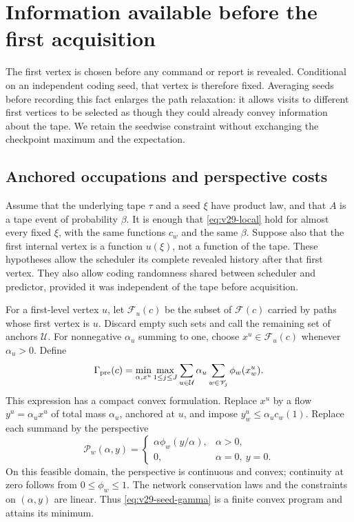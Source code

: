 \section{Information available before the first acquisition}
\label{sec:v29-initial}
The first vertex is chosen before any command or report is revealed.
Conditional on an independent coding seed, that vertex is therefore
fixed. Averaging seeds before recording this fact enlarges the path
relaxation: it allows visits to different first vertices to be selected
as though they could already convey information about the tape. We
retain the seedwise constraint without exchanging the checkpoint maximum
and the expectation.

\subsection{Anchored occupations and perspective costs}
Assume that the underlying tape $\tau$ and a seed $\xi$ have product
law, and that $A$ is a tape event of probability $\beta$. It is enough
that \eqref{eq:v29-local} hold for almost every fixed $\xi$, with the
same functions $c_w$ and the same $\beta$. Suppose also that the first
internal vertex is a function $u(\xi)$, not a function of the tape.
These hypotheses allow the scheduler its complete revealed history
after that first vertex. They also allow coding randomness shared
between scheduler and predictor, provided it was independent of the
tape before acquisition.

For a first-level vertex $u$, let $\mathcal F_u(c)$ be the subset of
$\mathcal F(c)$ carried by paths whose first vertex is $u$.
Discard empty such sets and call the remaining set of anchors $\mathcal U$.
For nonnegative $\alpha_u$ summing to one, choose
$x^u\in\mathcal F_u(c)$ whenever $\alpha_u>0$. Define
\begin{equation}\label{eq:v29-seed-gamma}
 \Gamma_{\rm pre}(c)=
 \min_{\alpha,x^u}\max_{1\le j\le J}
       \sum_{u\in\mathcal U}\alpha_u
                      \sum_{w\in\mathscr V_j}\phi_w(x^u_w).
\end{equation}
This expression has a compact convex formulation. Replace $x^u$ by a
flow $y^u=\alpha_u x^u$ of total mass $\alpha_u$, anchored at $u$, and
impose $y^u_w\le\alpha_u c_w(1)$. Replace each summand by the
perspective
\begin{equation}\label{eq:v29-perspective}
 \mathcal P_w(\alpha,y)=
 \begin{cases}
    \alpha\phi_w(y/\alpha),&\alpha>0,\\
    0,&\alpha=0,\ y=0.
 \end{cases}
\end{equation}
On this feasible domain, the perspective is continuous and convex;
continuity at zero follows from $0\le\phi_w\le1$.
The network conservation laws and the constraints on $(\alpha,y)$ are
linear. Thus \eqref{eq:v29-seed-gamma} is a finite convex program and
attains its minimum.

